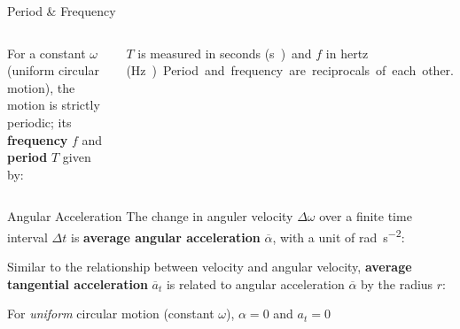\documentclass[12pt,compress,aspectratio=169]{beamer}
\newcommand{\mb}[1]{\ensuremath\mathbf{#1}}
\newcommand{\eq}[2]{\vspace{#1}{\Large\begin{displaymath}#2\end{displaymath}}}
\begin{document}
\begin{frame}{Period \& Frequency}
  \begin{columns}

    For a constant $\omega$ (uniform circular motion), the motion is strictly
    periodic; its \textbf{frequency} $f$ and \textbf{period} $T$ given by:

    \eq{-.15in}{
      \boxed{f=\frac\omega{2\pi}}\quad
      \boxed{T=\frac{2\pi}\omega}\quad
      \boxed{f=\frac1T}
    }
    
    $T$ is measured in seconds (\si\second) and $f$ in hertz (\si\hertz).
    Period and frequency are reciprocals of each other.
  \end{columns}
\end{frame}



\begin{frame}{Angular Acceleration}
  The change in anguler velocity $\Delta \omega$ over a finite time interval
  $\Delta t$ is \textbf{average angular acceleration} $\overline\alpha$, with
  a unit of \si{rad\per\second\squared}:

  \eq{-.2in}{
    \boxed{\overline\alpha=\frac{\Delta\omega}{\Delta t}}
  }

  Similar to the relationship between velocity and angular velocity,
  \textbf{average tangential acceleration} $\overline{a}_t$ is related to
  angular acceleration $\overline\alpha$ by the radius $r$:
    
  \eq{-.2in}{
    \boxed{\overline{a}_t
      =\frac{\Delta v}{\Delta t}
      =\frac{r\Delta\omega}{\Delta t}
      =r\overline\alpha
    }
  }
    
  For \emph{uniform} circular motion (constant $\omega$), $\alpha=0$ and
  $a_t=0$
\end{frame}
\end{document}

